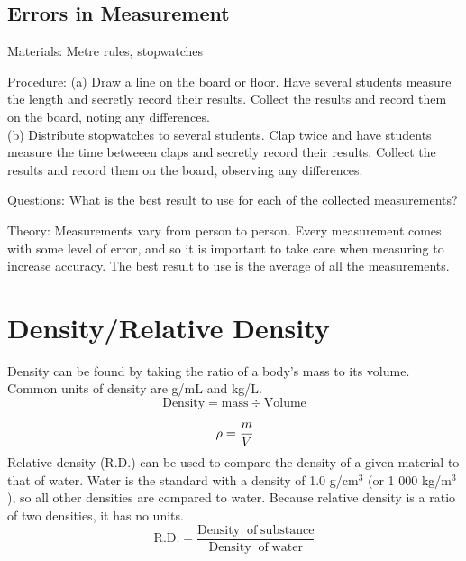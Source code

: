 \begin{multicols}{2}
\subsection{Errors in Measurement}
\label{sub:meas-errors}

\begin{description*}
\item[Materials:]{Metre rules, stopwatches}
\item[Procedure:]{(a) Draw a line on the board or floor. Have several students measure the length and secretly record their results. Collect the results and record them on the board, noting any differences.\\(b) Distribute stopwatches to several students. Clap twice and have students measure the time betweeen claps and secretly record their results. Collect the results and record them on the board, observing any differences.}
\item[Questions:]{What is the best result to use for each of the collected measurements?}
\item[Theory:]{Measurements vary from person to person. Every measurement comes with some level of error, and so it is important to take care when measuring to increase accuracy. The best result to use is the average of all the measurements.}
\end{description*}


\section*{Density/Relative Density}

Density can be found by taking the ratio of a body's mass to its volume. Common units of density are g/mL and kg/L. $$ \mathrm{Density} = \mathrm{mass} \div \mathrm{Volume} $$$$ \rho = \cfrac{m}{V} $$
Relative density (R.D.) can be used to compare the density of a given material to that of water.  Water is the standard with a density of 1.0 g/cm$^3$ (or 1 000 kg/m$^3$), so all other densities are compared to water. Because relative density is a ratio of two densities, it has no units.
$$\mathrm{R.D.} = \frac{\mathrm{Density\; \; of \;substance}}{\mathrm{Density\; \;of \;water}}$$



\end{multicols}
